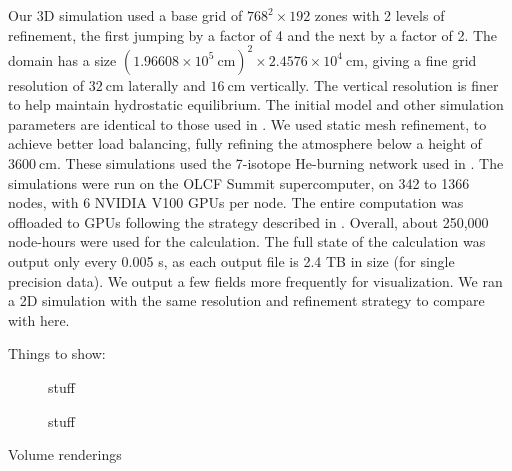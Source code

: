 \documentclass[twocolumn,times,tighten]{aastex631}
\begin{document}
Our 3D simulation used a base grid of $768^2 \times 192$ zones with 2
levels of refinement, the first jumping by a factor of 4 and the next
by a factor of 2.  The domain has a size $(1.96608\times
10^5~\mathrm{cm})^2 \times 2.4576\times 10^4~\mathrm{cm}$, giving a
fine grid resolution of $32~\mathrm{cm}$ laterally and
$16~\mathrm{cm}$ vertically.  The vertical resolution is finer to help
maintain hydrostatic equilibrium.  The initial model and other
simulation parameters are identical to those used in
\citet{harpole:2021}.  We used static mesh refinement, to achieve
better load balancing, fully refining the atmosphere below a height of
$3600~\mathrm{cm}$.  These simulations used the 7-isotope He-burning
network used in \citet{eiden:2020}.  The simulations were run on the
OLCF Summit supercomputer, on 342 to 1366 nodes, with 6 NVIDIA V100
GPUs per node.  The entire computation was offloaded to GPUs following
the strategy described in \citet{castro_gpu}.  Overall, about 250,000
node-hours were used for the calculation.  The full state of the
calculation was output only every 0.005 s, as each output file is 2.4 
TB in size (for single precision data).  We output a few fields more
frequently for visualization.  We ran a 2D simulation with the same
resolution and refinement strategy to compare with here.

Things to show:

\begin{figure*}[t]
\centering
{}
\caption{\label{fig:2d_abar} stuff}
\end{figure*}

\begin{figure}[t]
\centering
\caption{\label{fig:vr_abar} stuff}
\end{figure}


Volume renderings
\end{document}
